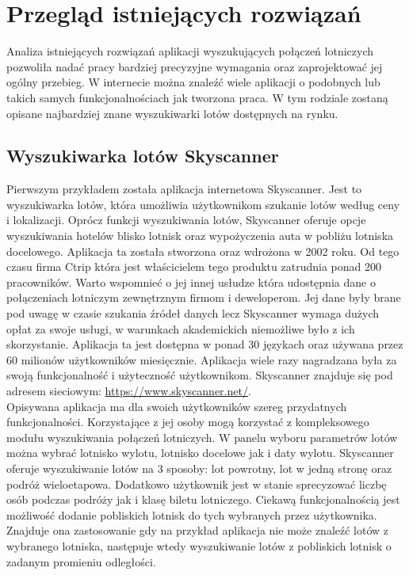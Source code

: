\documentclass[12pt, twoside]{report}
\begin{document}
\chapter{Przegląd istniejących rozwiązań}
Analiza istniejących rozwiązań aplikacji wyszukujących połączeń lotniczych pozwoliła nadać pracy bardziej precyzyjne wymagania oraz zaprojektować jej ogólny przebieg. W internecie można znaleźć wiele aplikacji o podobnych lub takich samych funkcjonalnościach jak tworzona praca. W tym rodziale zostaną opisane najbardziej znane wyszukiwarki lotów dostępnych na rynku. 
\section{Wyszukiwarka lotów Skyscanner}
Pierwszym przykładem została aplikacja internetowa Skyscanner. Jest to wyszukiwarka lotów, która umożliwia użytkownikom szukanie lotów według ceny i lokalizacji. Oprócz funkcji wyszukiwania lotów, Skyscanner oferuje opcje wyszukiwania hotelów blisko lotnisk oraz wypożyczenia auta w pobliżu lotniska docelowego. Aplikacja ta została stworzona oraz wdrożona w 2002 roku. Od tego czasu firma Ctrip która jest właścicielem tego produktu zatrudnia ponad 200 pracowników. Warto wspomnieć o jej innej usłudze która udostępnia dane o połączeniach lotniczym zewnętrznym firmom i deweloperom. Jej dane były brane pod uwagę w czasie szukania źródeł danych lecz Skyscanner wymaga dużych opłat za swoje usługi, w warunkach akademickich niemożliwe było z ich skorzystanie.
Aplikacja ta jest dostępna w ponad 30 językach oraz używana przez 60 milionów użytkowników miesięcznie. Aplikacja wiele razy nagradzana była za swoją funkcjonalność i użyteczność użytkownikom. Skyscanner znajduje się pod adresem sieciowym: 
\url{https://www.skyscanner.net/}.\\ \indent
Opisywana aplikacja ma dla swoich użytkowników szereg przydatnych funkcjonalności. Korzystające z jej osoby mogą korzystać z kompleksowego modułu wyszukiwania połączeń lotniczych. W panelu wyboru parametrów lotów można wybrać lotnisko wylotu, lotnisko docelowe jak i daty wylotu. Skyscanner oferuje wyszukiwanie lotów na 3 sposoby: lot powrotny, lot w jedną stronę oraz podróż wieloetapowa. Dodatkowo użytkownik jest w stanie sprecyzować liczbę osób podczas podróży jak i klasę biletu lotniczego. Ciekawą funkcjonalnością jest możliwość dodanie pobliskich lotnisk do tych wybranych przez użytkownika. Znajduje ona zastosowanie gdy na przykład aplikacja nie może znaleźć lotów z wybranego lotniska, następuje wtedy wyszukiwanie lotów z pobliskich lotnisk o zadanym promieniu odległości.
\end{document}
